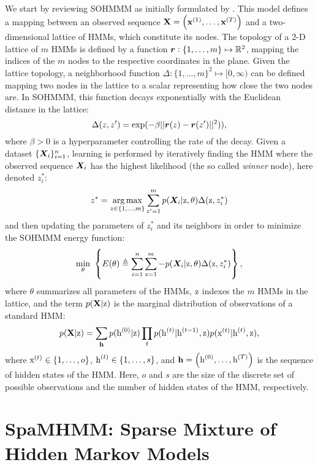 We start by reviewing SOHMMM as initially formulated by \citet{Ferles2008}. This model defines a mapping between an observed sequence ${\mathbf{X}} = \left({\mathbf{x}}^{(1)}, \dots,{\mathbf{x}}^{(T)} \right)$ and a two-dimensional lattice of HMMs, which constitute its nodes. The topology of a 2-D lattice of $m$ HMMs is defined by a function ${\bm{r}}: \{1, \dots, m\} \mapsto \mathbb{R}^2$, mapping the indices of the $m$ nodes to the respective coordinates in the plane. Given the lattice topology, a neighborhood function $\Delta: \{1, \dots, m\}^2 \mapsto [0, \infty)$ can be defined mapping two nodes in the lattice to a scalar representing how close the two nodes are. In SOHMMM, this function decays exponentially with the Euclidean distance in the lattice:
\begin{equation}
\label{eq:sohmmm_distance}
\Delta(z,z') = \exp(-\beta||{\bm{r}}(z)-{\bm{r}}(z')||^{2})),
\end{equation}
where $\beta > 0$ is a hyperparameter controlling the rate of the decay.
Given a dataset $\lbrace {\bm{X}}_i \rbrace_{i=1}^n$, learning is performed by iteratively finding the HMM where the observed sequence ${\bm{X}}_i$ has the highest likelihood (the so called \textit{winner} node), here denoted $z_i^*$:
\begin{equation}
	z^* = \operatorname*{arg\,max}_{z \in \{1,\dots,m\}} \sum_{z'=1}^{m} p({\bm{X}}_i | {\textnormal{z}}, \theta)\Delta({\textnormal{z}}, z_i^*)
\end{equation}
and then updating the parameters of $z_i^*$ and its neighbors in order to minimize the SOHMMM energy function:
\begin{equation}
\label{eq:sohmmm_energy}
\min_{\theta}~\left\lbrace E(\theta) \triangleq \sum_{i=1}^n \sum_{{\textnormal{z}}=1}^m -p({\bm{X}}_i | {\textnormal{z}}, \theta)\Delta({\textnormal{z}}, z_i^*) \right\rbrace,
\end{equation}
where $\theta$ summarizes all parameters of the HMMs, ${\textnormal{z}}$ indexes the $m$ HMMs in the lattice, and the term $p({\mathbf{X}} | {\textnormal{z}})$ is the marginal distribution of observations of a standard HMM:
\begin{equation}
\label{eq:sohmmm_hmm}
p({\mathbf{X}} | {\textnormal{z}}) = \sum_{{\mathbf{h}}} p({\textnormal{h}}^{(0)}|{\textnormal{z}}) \prod_t p({\textnormal{h}}^{(t)}|{\textnormal{h}}^{(t-1)},{\textnormal{z}}) p({\textnormal{x}}^{(t)}|{\textnormal{h}}^{(t)},{\textnormal{z}}),
\end{equation}
where ${\textnormal{x}}^{(t)} \in \{1, \dots, o\}$, ${\textnormal{h}}^{(t)} \in \{1, \dots, s\}$, and ${\mathbf{h}} = \left({\textnormal{h}}^{(0)}, \dots,{\textnormal{h}}^{(T)} \right)$ is the sequence of hidden states of the HMM. Here, $o$ and $s$ are the size of the discrete set of possible observations and the number of hidden states of the HMM, respectively.

\section{SpaMHMM: Sparse Mixture of Hidden Markov Models}
\label{sec:spamhmm}

